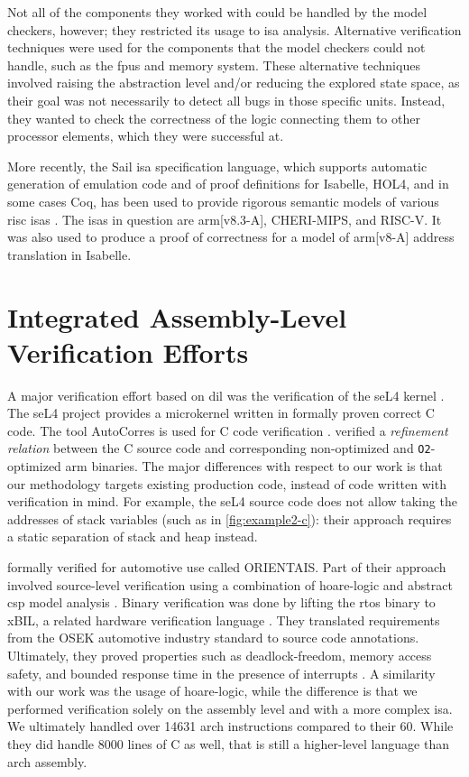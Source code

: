 Not all of the components they worked with could be handled by the model checkers,
however; they restricted its usage to \ac{isa} analysis.
Alternative verification techniques were used for the components that the model checkers
could not handle, such as the \acp{fpu} and memory system.
These alternative techniques involved raising the abstraction level
and/or reducing the explored state space,
as their goal was not necessarily to detect all bugs in those specific units.
Instead, they wanted to check the correctness of the logic connecting them
to other processor elements, which they were successful at.

More recently, the Sail \ac{isa} specification language,
which supports automatic generation of emulation code
and of proof definitions for Isabelle, HOL4, and in some cases Coq,
has been used to provide rigorous semantic models of various \ac{risc} \acp{isa}
\autocite{armstrong2018models,armstrong2019isa}.
The \acp{isa} in question are \gls{arm}[v8.3-A], CHERI-MIPS, and RISC-V.
It was also used to produce a proof of correctness for a model of
\gls{arm}[v8-A] address translation in Isabelle.

\section{Integrated Assembly-Level Verification Efforts}\label{se:integrated_assembly}
A major verification effort based on \acl{dil}
was the verification of the seL4 kernel \autocite{klein2009sel4,Klein_AEMSKH_14}.
The seL4 project provides a microkernel written in formally proven correct C code.
The tool AutoCorres is used for C code verification \autocite{greenaway2012bridging}.
\Textcite{sewell2013tvv} verified a \emph{refinement relation} between the C source code
and corresponding non-optimized and \lstinline|O2|-optimized \gls{arm} binaries.
The major differences with respect to our work
is that our methodology targets existing production code,
instead of code written with verification in mind.
For example, the seL4 source code does not allow taking the addresses of stack variables
(such as in \cref{fig:example2-c}):
their approach requires a static separation of stack and heap instead.

\Textcite{shi2012orientais} formally verified  for automotive use
called ORIENTAIS.
Part of their approach involved source-level verification
using a combination of \gls{hoare-logic}
and abstract \ac{csp} model analysis \autocite{hoare1978csp}.
Binary verification was done by lifting the \ac{rtos} binary to xBIL,
a related hardware verification language \autocite{shi2012xbil}.
They translated requirements from the OSEK automotive industry standard
to source code annotations.
Ultimately, they proved properties such as deadlock-freedom, memory access safety,
and bounded response time in the presence of interrupts \autocite{shi2012interrupt}.
A similarity with our work was the usage of \gls{hoare-logic},
while the difference is that we performed verification solely on the assembly level
and with a more complex \ac{isa}.
We ultimately handled over \num{14631} \gls{arch} instructions compared to their \num{60}.
While they did handle \num{8000} lines of C as well,
that is still a higher-level language than \gls{arch} assembly.

